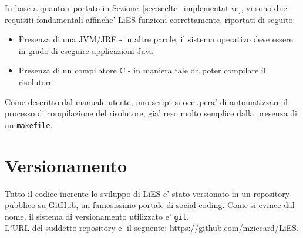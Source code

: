 \documentclass[10pt, a4paper]{article}
\begin{document}
In base a quanto riportato in Sezione~\ref{sec:scelte_implementative}, vi sono due requisiti fondamentali affinche' LiES funzioni correttamente, riportati di seguito:
\begin{itemize}
	\item Presenza di una JVM/JRE - in altre parole, il sistema operativo deve essere in grado di eseguire applicazioni Java
	\item Presenza di un compilatore C - in maniera tale da poter compilare il risolutore
\end{itemize}

Come descritto dal manuale utente, uno script si occupera' di automatizzare il processo di compilazione del risolutore, gia' reso molto semplice dalla presenza di un \verb+makefile+.


\section{Versionamento}
\label{sec:versionamento}

Tutto il codice inerente lo sviluppo di LiES e' stato versionato in un repository pubblico su GitHub, un famosissimo portale di social coding. Come si evince dal nome, il sistema di versionamento utilizzato e' \verb+git+.\\

L'URL del suddetto repository e' il seguente: \url{https://github.com/mziccard/LiES}.

\end{document}
